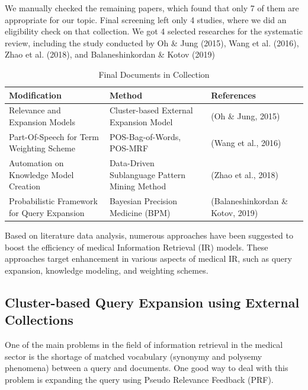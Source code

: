 \documentclass[conference]{IEEEtran}
\begin{document}
We manually checked the remaining papers, which found that only 7 of them are appropriate for our topic. Final screening left only 4 studies, where we did an eligibility check on that collection. We got 4 selected researches for the systematic review, including the study conducted by Oh \& Jung (2015), Wang et al. (2016), Zhao et al. (2018), and Balaneshinkordan \& Kotov (2019)

\begin{table}[htbp!]
    \centering
    \caption{Final Documents in Collection}
    \begin{tabular}{|>{\centering}m{2.5cm}|>{\centering}m{2.5cm}|>{\centering\arraybackslash}m{2.5cm}|}
        \hline
        \textbf{Modification} & \textbf{Method} & \textbf{References} \\
        \hline
        Relevance and Expansion Models & Cluster-based External Expansion Model & (Oh \& Jung, 2015) \\
        \hline
        Part-Of-Speech for Term Weighting Scheme & POS-Bag-of-Words, POS-MRF & (Wang et al., 2016) \\
        \hline
        Automation on Knowledge Model Creation & Data-Driven Sublanguage Pattern Mining Method & (Zhao et al., 2018) \\
        \hline
        Probabilistic Framework for Query Expansion & Bayesian Precision Medicine (BPM) & (Balaneshinkordan \& Kotov, 2019) \\
        \hline
    \end{tabular}
    \label{table:PRISMA-Result}
\end{table}

Based on literature data analysis, numerous approaches have been suggested to boost the efficiency of medical Information Retrieval (IR) models. These approaches target enhancement in  various aspects of medical IR, such as query expansion, knowledge modeling, and weighting schemes.

\subsection{Cluster-based Query Expansion using External Collections}

One of the main problems in the field of information retrieval in the medical sector is the shortage of matched vocabulary (synonymy and polysemy phenomena) between a query and documents. One good way to deal with this problem is expanding the query using Pseudo Relevance Feedback (PRF).
\end{document}
